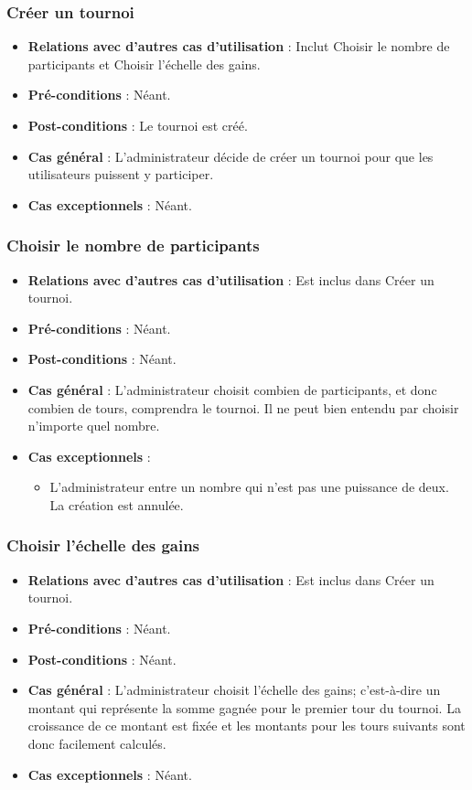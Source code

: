 \documentclass[a4paper,titlepage]{scrreprt}
\begin{document}
    \subsubsection{Créer un tournoi}
      \begin{itemize}
        \item \textbf{Relations avec d'autres cas d'utilisation}  : Inclut Choisir le nombre de participants et Choisir l'échelle des gains.
        \item \textbf{Pré-conditions} : Néant.
        \item \textbf{Post-conditions} : Le tournoi est créé.
        \item \textbf{Cas général} : L'administrateur décide de créer un tournoi pour que les utilisateurs puissent y participer.
        \item \textbf{Cas exceptionnels} : Néant.
      \end{itemize}

    \subsubsection{Choisir le nombre de participants}
      \begin{itemize}
        \item \textbf{Relations avec d'autres cas d'utilisation}  : Est inclus dans Créer un tournoi.
        \item \textbf{Pré-conditions} : Néant.
        \item \textbf{Post-conditions} : Néant.
        \item \textbf{Cas général} : L'administrateur choisit combien de participants, et donc combien de tours, comprendra le tournoi. Il ne peut bien entendu par choisir n'importe quel nombre.
        \item \textbf{Cas exceptionnels} : 
          \begin{itemize}
            \item L'administrateur entre un nombre qui n'est pas une puissance de deux. La création est annulée.
          \end{itemize}
      \end{itemize}

    \subsubsection{Choisir l'échelle des gains}
      \begin{itemize}
        \item \textbf{Relations avec d'autres cas d'utilisation}  : Est inclus dans Créer un tournoi.
        \item \textbf{Pré-conditions} : Néant.
        \item \textbf{Post-conditions} : Néant.
        \item \textbf{Cas général} : L'administrateur choisit l'échelle des gains; c'est-à-dire un montant qui représente la somme gagnée pour le premier tour du tournoi. La croissance de ce montant est fixée et les montants pour les tours suivants sont donc facilement calculés.
        \item \textbf{Cas exceptionnels} : Néant.
      \end{itemize}
  
\end{document}
